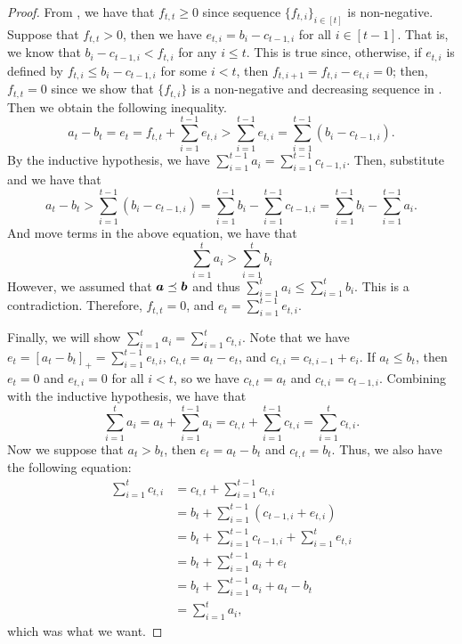 \documentclass[runningheads]{llncs}
\begin{document}
\begin{proof}
From , we have that $f_{t,t}\geq 0$ since sequence $\{f_{t,i}\}_{i\in[t]}$ is non-negative. 
Suppose that $f_{t,t}>0$, then we have $e_{t,i} = b_i - c_{t-1, i}$ for all $i\in[t-1]$. 
That is, we know that $ b_i - c_{t-1,i}<f_{t,i}$ for any $i\leq t$.
This is true since, otherwise, if $e_{t,i}$ is defined by $f_{t,i}\leq b_i - c_{t-1,i}$ for some $i<t$, then $f_{t,i+1}= f_{t,i} - e_{t,i} = 0$;
then, $f_{t,t} = 0$ since we show that $\{f_{t,i}\}$ is a non-negative and decreasing sequence in . Then we obtain the following inequality.
\begin{equation}\label{eqn: ftt}
a_t - b_t = e_t 
= f_{t,t} + \sum_{i=1}^{t-1} e_{t,i} 
> \sum_{i=1}^{t-1} e_{t,i} 
= \sum_{i=1}^{t-1} (b_i-c_{t-1, i}).
\end{equation}
By the inductive hypothesis, we have $\sum_{i=1}^{t-1} a_i = \sum_{i=1}^{t-1} c_{t-1,i}$. Then, substitute and we have that 
$$
a_t - b_t > \sum_{i=1}^{t-1} (b_i-c_{t-1, i})= \sum_{i=1}^{t-1} b_i-\sum_{i=1}^{t-1} c_{t-1, i} = \sum_{i=1}^{t-1} b_i-\sum_{i=1}^{t-1} a_i. 
$$
And move terms in the above equation, we have that
$$
\sum_{i=1}^{t} a_i > \sum_{i=1}^{t} b_i
$$
However, we assumed that $\boldsymbol a\preceq\boldsymbol b$ and thus $\sum_{i=1}^ta_i\leq\sum_{i=1}^tb_i$. This is a contradiction. 
Therefore, $f_{t,t} = 0$, and $e_t = \sum_{i=1}^{t-1} e_{t,i}.$

Finally, we will show $\sum_{i=1}^t a_i = \sum_{i=1}^t c_{t,i}$. 
Note that we have $ e_t = [a_t - b_t]_+ = \sum_{i=1}^{t-1} e_{t,i}$, $c_{t,t} = a_t - e_t$, and $c_{t,i} = c_{t,i-1} + e_i$.
If $a_t\leq b_t$, then $e_t = 0$ and $e_{t,i} = 0$ for all $i<t$, so we have $c_{t,t} = a_t$ and $c_{t,i} = c_{t-1,i}$. Combining with the inductive hypothesis, we have that 
$$\sum_{i=1}^{t} a_i = a_t + \sum_{i=1}^{t-1} a_i = c_{t,t} + \sum_{i=1}^{t-1}c_{t,i} = \sum_{i=1}^{t} c_{t,i}.$$
Now we suppose that $a_t > b_t$, then $e_t = a_t - b_t$ and $c_{t,t} = b_t$.
Thus, we also have the following equation:
\begin{equation}\begin{split}
\sum_{i=1}^t c_{t,i} 
&= c_{t,t} + \sum_{i=1}^{t-1} c_{t,i}  \\
&= b_{t} + \sum_{i=1}^{t-1} (c_{t-1,i} + e_{t,i}) \\
&= b_{t} + \sum_{i=1}^{t-1} c_{t-1,i} + \sum_{i=1}^{t}e_{t,i} \\
&= b_{t} + \sum_{i=1}^{t-1} a_{i} + e_t \\
&= b_{t} + \sum_{i=1}^{t-1} a_{i} + a_t-b_t\\
&= \sum_{i=1}^{t} a_{i},
\end{split}\end{equation}
which was what we want.
\end{proof}
\end{document}
